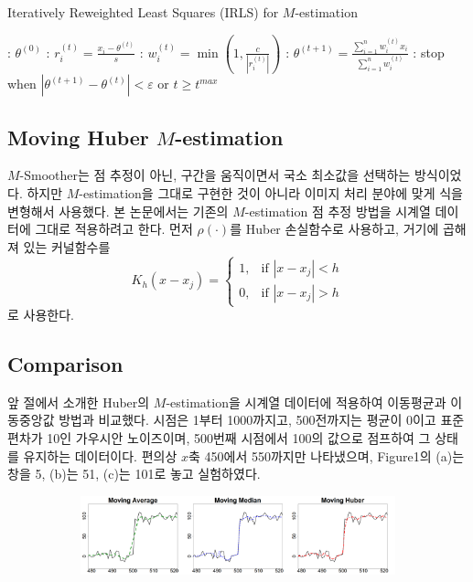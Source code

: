 \documentclass[letterpaper,12pt]{article}
\begin{document}
{\begin{algorithm}[H]
\caption{Iteratively Reweighted Least Squares (IRLS) for $M$-estimation}
\label{alg:StoTheta}
    \begin{algorithmic}
        : $\theta^{(0)}$
        : $r_i^{(t)} = \frac{x_i - \theta^{(t)}}{s}$ 
        : $w_i^{(t)} = \min\left( 1, \frac{c}{|r_i^{(t)}|} \right)$
        : $\theta^{(t+1)} = \frac{\sum_{i=1}^n w_i^{(t)} x_i}{\sum_{i=1}^n w_i^{(t)}}$
        : stop when $\left| \theta^{(t+1)} - \theta^{(t)} \right| < \varepsilon$ or $t \geq t^{max}$
    \end{algorithmic}
\end{algorithm}





\subsection{Moving Huber $M$-estimation}\label{sec:setup}
$M$-Smoother는 점 추정이 아닌, 구간을 움직이면서 국소 최소값을 선택하는 방식이었다. 하지만 $M$-estimation을 그대로 구현한 것이 아니라 이미지 처리 분야에 맞게 식을 변형해서 사용했다. 본 논문에서는 기존의 $M$-estimation 점 추정 방법을 시계열 데이터에 그대로 적용하려고 한다. 먼저 $\rho(\cdot)$를 Huber 손실함수로 사용하고, 거기에 곱해져 있는 커널함수를
\[
K_h(x-x_j)=
\begin{cases}
    1 , & \text{if } |x-x_j|<h \\
    0 , & \text{if } |x-x_j|>h
\end{cases}
\]
로 사용한다.


\subsection{Comparison}\label{sec:setup}

앞 절에서 소개한 Huber의 $M$-estimation을 시계열 데이터에 적용하여 이동평균과 이동중앙값 방법과 비교했다. 시점은 1부터 1000까지고, 500전까지는 평균이 0이고 표준편차가 10인 가우시안 노이즈이며, 500번째 시점에서 100의 값으로 점프하여 그 상태를 유지하는 데이터이다. 편의상 $x$축 450에서 550까지만 나타냈으며, Figure1의 (a)는 창을 5, (b)는 51, (c)는 101로 놓고 실험하였다.
\begin{figure}[H]
    \centering
    \begin{subfigure}[b]{\linewidth}
        \centering
        \includegraphics[width=\linewidth]{figures/3comparison5.png}
        \caption{}
    \end{subfigure}
    

\end{figure}}
\end{document}
